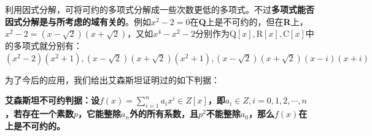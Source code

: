\documentclass[12pt]{article}
\begin{document}
利用因式分解，可将可约的多项式分解成一些次数更低的多项式。不过\textbf{多项式能否因式分解是与所考虑的域有关的}。例如$x^2 - 2 = 0$在\textbf{Q}上是不可约的，但在\textbf{R}上，$x^2 - 2 = (x - \sqrt{2})(x + \sqrt{2})$，又如$x^4 - x^2 - 2$分别作为$\text{Q}[x], \text{R}[x],\text{C}[x]$中的多项式就分别有：$(x^2 - 2)(x^2 + 1), (x-\sqrt{2})(x+\sqrt{2})(x^2+1), (x-\sqrt{2})(x+\sqrt{2})(x-i)(x+i)$

为了今后的应用，我们给出艾森斯坦证明过的如下判据：
\begin{mdframed}[
linecolor=black!40,outerlinewidth=1pt,roundcorner=.5em,innertopmargin=1ex,innerbottommargin=.5\baselineskip,innerrightmargin=1em,innerleftmargin=1em,backgroundcolor=gray!5,
]
\textbf{
艾森斯坦不可约判据：设$f(x) = \sum_{i=1}^na_ix^i \in Z[x]$，即$a_i \in Z, i = 0, 1, 2, \cdots, n$，若存在一个素数$p$，它能整除$a_n$外的所有系数，且$p^2$不能整除$a_0$，那么$f(x)$在 上是不可约的。
}
\end{mdframed}
\end{document}
